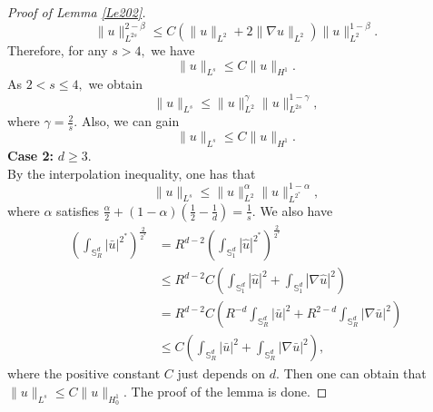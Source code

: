 \documentclass[reqno]{amsart}
\numberwithin{equation}{section}
\newenvironment{key words}{\textbf{Keywords}\mbox{  }}{ }
\begin{document}
\begin{proof}[Proof of Lemma \ref{Le202}]
	\[\|u\|^{2-\beta}_{L^{2s}}\leq C(\|u\|_{L^{2}}+2\|\nabla u\|_{L^{2}})\|u\|^{1-\beta}_{L^{2}}.\]
	Therefore, for any $s>4,$ we have \[\|u\|_{L^{s}}\leq C\|u\|_{H^{1}}.\]
	As $2<s\leq4,$ we obtain
	\[\|u\|_{L^{s}}\leq\|u\|_{L^{2}}^{\gamma}\|u\|_{L^{2s}}^{1-\gamma},\]
	where $\gamma=\frac{2}{s}.$ Also, we can gain
	\[\|u\|_{L^{s}}\leq C\|u\|_{H^{1}}.\]
	\textbf{Case 2:} $d\geq3.$\\
	By the interpolation inequality, one has that
	\[\|u\|_{L^{s}}\leq\|u\|_{L^{2}}^{\alpha}\|u\|_{L^{2^{\ast}}}^{1-\alpha},\]
	where $\alpha$ satisfies $\frac{\alpha}{2}+(1-\alpha)(\frac{1}{2}-\frac{1}{d})=\frac{1}{s}.$ We also have
	\begin{align*}
		\left(\int_{\mathbb{S}_{R}^{d}}|\bar{u}|^{2^{\ast}}\right)^{\frac{2}{2^{\ast}}}&= R^{d-2}\left(\int_{\mathbb{S}_{1}^{d}}|\hat{u}|^{2^{\ast}}\right)^{\frac{2}{2^{\ast}}} \\
		&\leq R^{d-2}C\left(\int_{\mathbb{S}_{1}^{d}}|\hat{u}|^{2}+\int_{\mathbb{S}_{1}^{d}}|\nabla \hat{u}|^{2}\right)\\
		&= R^{d-2}C\left(R^{-d}\int_{\mathbb{S}_{R}^{d}}|\bar{u}|^{2}+R^{2-d}\int_{\mathbb{S}_{R}^{d}}|\nabla \bar{u}|^{2}\right)\\
		&\leq C\left(\int_{\mathbb{S}_{R}^{d}}|\bar{u}|^{2}+\int_{\mathbb{S}_{R}^{d}}|\nabla \bar{u}|^{2}\right),
	\end{align*}
	where the positive constant $C$ just depends on $d$. Then one can obtain that $\|u\|_{L^{s}}\leq C\|u\|_{H_{0}^{1}}.$ The proof of the lemma is done.
\end{proof}
\bigskip
\end{document}
